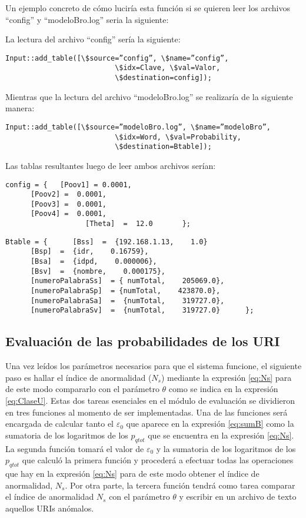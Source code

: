 Un ejemplo concreto de cómo luciría esta función si se quieren leer los archivos “config” y “modeloBro.log” seria la siguiente:

La lectura del archivo “config” sería la siguiente:

\begin{verbatim}
Input::add_table([\$source=”config”, \$name=”config”,
                          \$idx=Clave, \$val=Valor,
                          \$destination=config]);
\end{verbatim}                    

Mientras que la lectura del archivo “modeloBro.log” se realizaría de la siguiente manera:

\begin{verbatim}
Input::add_table([\$source=”modeloBro.log”, \$name=”modeloBro”,
                          \$idx=Word, \$val=Probability,
                          \$destination=Btable]);
\end{verbatim}

Las tablas resultantes luego de leer ambos archivos serían:

\begin{verbatim}
config = {   [Poov1] = 0.0001,
      [Poov2] =  0.0001,
      [Poov3] =  0.0001,
      [Poov4] =  0.0001,
                   [Theta]  =  12.0       };
\end{verbatim}

\begin{verbatim}
Btable = {      [Bss]  =  {192.168.1.13,    1.0}
      [Bsp]  =  {idr,    0.16759},
      [Bsa]  =  {idpd,    0.000006},
      [Bsv]  =  {nombre,    0.000175},
      [numeroPalabraSs]  = { numTotal,    205069.0},
      [numeroPalabraSp]  = {numTotal,    423870.0},
      [numeroPalabraSa]  =  {numTotal,    319727.0},
      [numeroPalabraSv]  =  {numTotal,    319727.0}      };
\end{verbatim}

\subsection{Evaluación de las probabilidades de los URI}

Una vez leídos los parámetros necesarios para que el sistema funcione, el siguiente paso es hallar el índice de anormalidad ($N_{s}$) mediante la expresión \ref{eq:Ns} para de este modo compararlo con el parámetro $\theta$ como se indica en la expresión \ref{eq:ClaseU}. Estas dos tareas esenciales en el módulo de evaluación se dividieron en tres funciones al momento de ser implementadas. Una de las funciones será encargada de calcular tanto el $\varepsilon_{0}$ que aparece en la expresión \ref{eq:sumB} como la sumatoria de los logaritmos de los $p_{qtot}$ que se encuentra en la expresión \ref{eq:Ns}. La segunda función tomará el valor de $\varepsilon_{0}$ y la sumatoria de los logaritmos de los $p_{qtot}$ que calculó la primera función y procederá a efectuar todas las operaciones que hay en la expresión \ref{eq:Ns} para de este modo obtener el índice de anormalidad, $N_{s}$. Por otra parte, la tercera función tendrá como tarea comparar el índice de anormalidad $N_{s}$ con el parámetro $\theta$ y escribir en un archivo de texto aquellos URIs anómalos.

